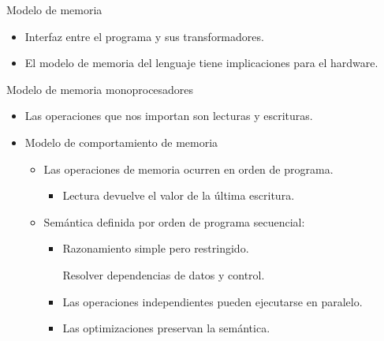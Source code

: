 \documentclass[12pt, twoside, openright]{report} %
\begin{document}
Modelo de memoria

\begin{itemize}

	\item Interfaz entre el programa y sus transformadores.
	\item El modelo de memoria del lenguaje tiene implicaciones para el
	      hardware.

	      \begin{figure}[H]
		      {\def\svgwidth{.8\textwidth}
			      }
	      \end{figure}
\end{itemize}

Modelo de memoria monoprocesadores

\begin{itemize}

	\item Las operaciones que nos importan son lecturas y escrituras.
	\item Modelo de comportamiento de memoria

	      \begin{itemize}

		      \item Las operaciones de memoria ocurren en orden de programa.

		            \begin{itemize}

			            \item Lectura devuelve el valor de la última escritura.
		            \end{itemize}
		      \item Semántica definida por orden de programa secuencial:

		            \begin{itemize}

			            \item Razonamiento simple pero restringido.

			                  Resolver dependencias de datos y control.

			            \item Las operaciones independientes pueden ejecutarse en
			                  paralelo.
			            \item Las optimizaciones preservan la semántica.
		            \end{itemize}
	      \end{itemize}
\end{itemize}
\end{document}
